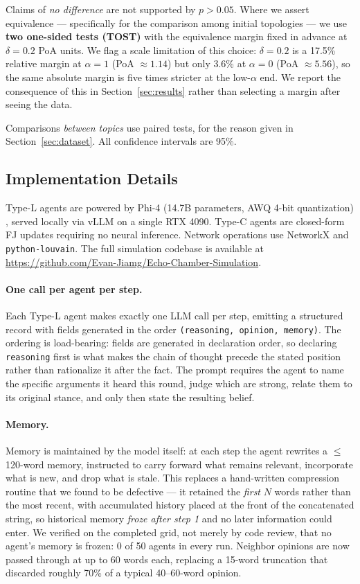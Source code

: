 Claims of \emph{no difference} are not supported by $p > 0.05$. Where we assert
equivalence --- specifically for the comparison among initial topologies --- we use
\textbf{two one-sided tests (TOST)} with the equivalence margin fixed in advance at
$\delta = 0.2$ PoA units. We flag a scale limitation of this choice: $\delta = 0.2$ is a
17.5\% relative margin at $\alpha = 1$ (PoA $\approx 1.14$) but only 3.6\% at
$\alpha = 0$ (PoA $\approx 5.56$), so the same absolute margin is five times stricter at
the low-$\alpha$ end. We report the consequence of this in Section~\ref{sec:results}
rather than selecting a margin after seeing the data.

Comparisons \emph{between topics} use paired tests, for the reason given in
Section~\ref{sec:dataset}. All confidence intervals are 95\%.

\subsection{Implementation Details}
\label{sec:impl}

Type-L agents are powered by Phi-4 (14.7B parameters, AWQ 4-bit quantization)
\citep{abdin2024phi4}, served locally via vLLM \citep{kwon2023vllm} on a single
RTX 4090. Type-C agents are closed-form FJ updates requiring no neural inference.
Network operations use NetworkX and \texttt{python-louvain}. The full simulation
codebase is available at
\url{https://github.com/Evan-Jiamg/Echo-Chamber-Simulation}.

\paragraph{One call per agent per step.}
Each Type-L agent makes exactly one LLM call per step, emitting a structured record with
fields generated in the order \texttt{(reasoning, opinion, memory)}. The ordering is
load-bearing: fields are generated in declaration order, so declaring \texttt{reasoning}
first is what makes the chain of thought precede the stated position rather than
rationalize it after the fact. The prompt requires the agent to name the specific
arguments it heard this round, judge which are strong, relate them to its original
stance, and only then state the resulting belief.

\paragraph{Memory.}
Memory is maintained by the model itself: at each step the agent rewrites a
$\le$120-word memory, instructed to carry forward what remains relevant, incorporate what
is new, and drop what is stale. This replaces a hand-written compression routine that we
found to be defective --- it retained the \emph{first} $N$ words rather than the most
recent, with accumulated history placed at the front of the concatenated string, so
historical memory \emph{froze after step 1} and no later information could enter. We
verified on the completed grid, not merely by code review, that no agent's memory is
frozen: 0 of 50 agents in every run. Neighbor opinions are now passed through at up to
60 words each, replacing a 15-word truncation that discarded roughly 70\% of a typical
40--60-word opinion.

